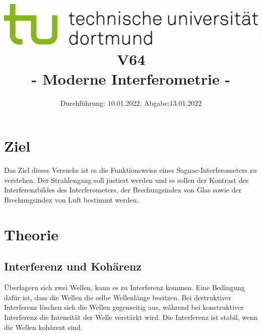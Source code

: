 
\usepackage{romannum}
\usepackage{listings}
\lstset{numbers=left, numberstyle=\tiny, numbersep=5pt}
\lstset{language=Perl}

\title{\includegraphics[scale=0.8]{../logo.jpg} \\ \vspace*{1cm} V64 \\ - Moderne Interferometrie -}

\date{Durchführung: 10.01.2022, Abgabe:13.01.2022}



\maketitle

\tableofcontents
\newpage

\section{Ziel}
Das Ziel dieses Versuchs ist es die Funktionsweise eines Sagnac-Interferometers zu verstehen. Der Strahlengang soll justiert werden und es sollen der Kontrast des Interferenzbildes des Interferometers, der Brechungsindex von Glas sowie der Brechungsindex von Luft bestimmt werden.

\section{Theorie}

\subsection{Interferenz und Kohärenz}
Überlagern sich zwei Wellen, kann es zu Interferenz kommen. Eine Bedingung dafür ist, dass die Wellen die selbe Wellenlänge besitzen.
Bei destruktiver Interferenz löschen sich die Wellen gegenseitig aus, während bei konstruktiver Interferenz die Intensität der Welle verstärkt wird.
Die Interferenz ist stabil, wenn die Wellen kohärent sind.

